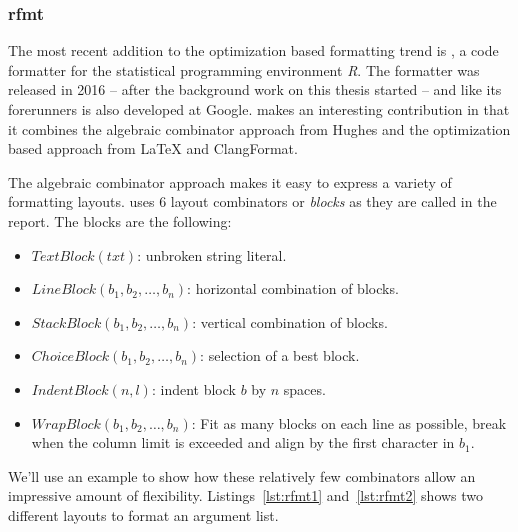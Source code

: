 \subsubsection{rfmt}
The most recent addition to the optimization based formatting trend is \rfmt\autocite{yelland_new_2016},
a code formatter for the statistical programming environment \emph{R}.
The formatter was released in 2016 -- after the background work on this thesis started -- and like its forerunners is also developed at Google.
\rfmt{} makes an interesting contribution in that it combines the algebraic combinator approach from Hughes\autocite{hughes_design_1995} and the optimization based approach from \LaTeX{} and ClangFormat.

The algebraic combinator approach makes it easy to express a variety of formatting layouts.
\rfmt{} uses 6 layout combinators or \emph{blocks} as they are called in the report.
The blocks are the following:
\begin{itemize}
  \item $TextBlock(txt)$: unbroken string literal.
  \item $LineBlock(b_1, b_2, \ldots, b_n)$: horizontal combination of blocks.
  \item $StackBlock(b_1, b_2, \ldots, b_n)$: vertical combination of blocks.
  \item $ChoiceBlock(b_1, b_2, \ldots, b_n)$: selection of a best block.
  \item $IndentBlock(n, l)$: indent block $b$ by $n$ spaces.
  \item $WrapBlock(b_1, b_2, \ldots, b_n)$:
    Fit as many blocks on each line as possible, break when the column limit is exceeded and align by the first character in $b_1$.
\end{itemize}
We'll use an example to show how these relatively few combinators allow an impressive amount of flexibility.
Listings~\ref{lst:rfmt1} and~\ref{lst:rfmt2} shows two different layouts to format an argument list.

\begin{minipage}{.45\textwidth}
  
\end{minipage}
\hfil
\begin{minipage}{.45\textwidth}
  
\end{minipage}

